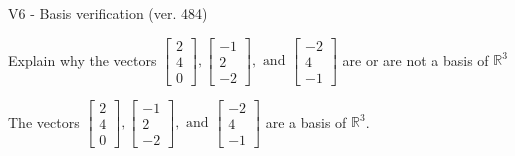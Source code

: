 \begin{exercise}
  \begin{exerciseTitle}V6 - Basis verification (ver. 484)\end{exerciseTitle}
  \begin{exerciseStatement}
    Explain why the vectors \(\left[\begin{array}{r}
2 \\
4 \\
0
\end{array}\right] , \left[\begin{array}{r}
-1 \\
2 \\
-2
\end{array}\right] , \text{ and } \left[\begin{array}{r}
-2 \\
4 \\
-1
\end{array}\right]\) are or are not a basis of \(\mathbb{R}^3\)	


  \end{exerciseStatement}
  \begin{exerciseAnswer}
   The vectors \(\left[\begin{array}{r}
2 \\
4 \\
0
\end{array}\right] , \left[\begin{array}{r}
-1 \\
2 \\
-2
\end{array}\right] , \text{ and } \left[\begin{array}{r}
-2 \\
4 \\
-1
\end{array}\right]\) 
  	 are  a basis of \(\mathbb{R}^3\).
  


  \end{exerciseAnswer}
\end{exercise}